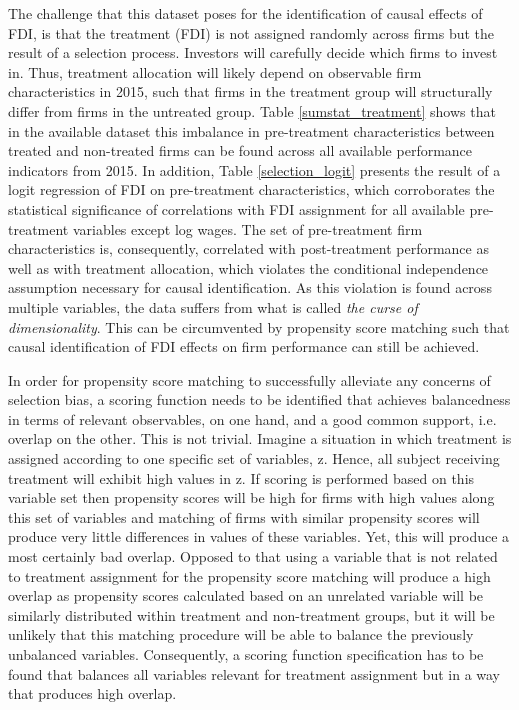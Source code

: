 
The challenge that this dataset poses for the identification of causal effects of FDI, is that the treatment (FDI) is not assigned randomly across firms but the result of a selection process. Investors will carefully decide which firms to invest in. Thus, treatment allocation will likely depend on observable firm characteristics in 2015, such that firms in the treatment group will structurally differ from firms in the untreated group. Table \ref{sumstat_treatment} shows that in the available dataset this imbalance in pre-treatment characteristics between treated and non-treated firms can be found across all available performance indicators from 2015. In addition, Table \ref{selection_logit} presents the result of a logit regression of FDI on pre-treatment characteristics, which corroborates the statistical significance of correlations with FDI assignment for all available pre-treatment variables except log wages. The set of pre-treatment firm characteristics is, consequently, correlated with post-treatment performance as well as with treatment allocation, which violates the conditional independence assumption necessary for causal identification. As this violation is found across multiple variables, the data suffers from what is called \textit{the curse of dimensionality}. This can be circumvented by propensity score matching such that causal identification of FDI effects on firm performance can still be achieved.\\ \par 

 


 
 In order for propensity score matching to successfully alleviate any concerns of selection bias, a scoring function needs to be identified that achieves balancedness in terms of relevant observables, on one hand, and a good common support, i.e. overlap on the other. This is not trivial. Imagine a situation in which treatment is assigned according to one specific set of variables, z. Hence, all subject receiving treatment will exhibit high values in z. If scoring is performed based on this variable set then propensity scores will be high for firms with high values along this set of variables and matching of firms with similar propensity scores will produce very little differences in values of these variables. Yet, this will produce a most certainly bad overlap. Opposed to that using a variable that is not related to treatment assignment for the propensity score matching will produce a high overlap as propensity scores calculated based on an unrelated variable will be similarly distributed within treatment and non-treatment groups, but it will be unlikely that this matching procedure will be able to balance the previously unbalanced variables. Consequently, a scoring function specification has to be found that balances all variables relevant for treatment assignment but in a way that produces high overlap. \\ \par 
 
